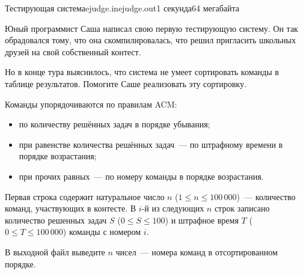 \begin{problem}{Тестирующая система}{ejudge.in}{ejudge.out}{1 секунда}{64 мегабайта}

Юный программист Саша написал свою первую тестирующую систему. Он так обрадовался тому, 
что она скомпилировалась, что решил пригласить школьных друзей на свой собственный контест.

Но в конце тура выяснилось, что система не умеет сортировать команды в таблице результатов.
Помогите Саше реализовать эту сортировку.

Команды упорядочиваются по правилам ACM: 
\begin{itemize}
\item по количеству решённых задач в порядке убывания;
\item при равенстве количества решённых задач~--- по штрафному времени в порядке возрастания;
\item при прочих равных~--- по номеру команды в порядке возрастания.
\end{itemize}

\InputFile

Первая строка содержит натуральное число $n$ ($1 \leqslant n \leqslant 100\,000$)~---
количество команд, участвующих в контесте.
В $i$-й из следующих $n$ строк записано количество решенных 
задач $S$ ($0 \leqslant S \leqslant 100$) и штрафное время $T$ ($0 \leqslant T \leqslant 100\,000$) команды с
номером $i$.

\OutputFile

В выходной файл выведите $n$ чисел~--- номера команд в отсортированном порядке.

\Example

\begin{example}
%
\end{example}

\end{problem}
